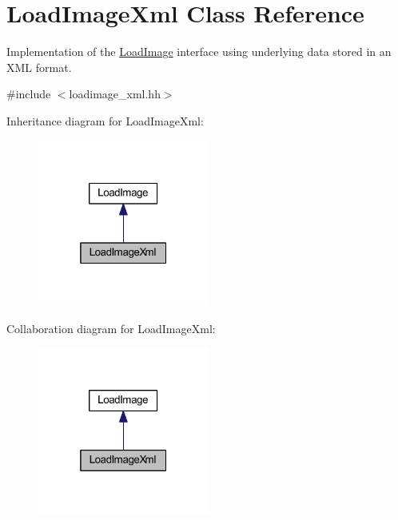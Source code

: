 \hypertarget{class_load_image_xml}{}\section{Load\+Image\+Xml Class Reference}
\label{class_load_image_xml}


Implementation of the \mbox{\hyperlink{class_load_image}{Load\+Image}} interface using underlying data stored in an X\+ML format.  




{\ttfamily \#include $<$loadimage\+\_\+xml.\+hh$>$}



Inheritance diagram for Load\+Image\+Xml\+:
\nopagebreak
\begin{figure}[H]
\begin{center}
\leavevmode
\includegraphics[width=160pt]{class_load_image_xml__inherit__graph}
\end{center}
\end{figure}


Collaboration diagram for Load\+Image\+Xml\+:
\nopagebreak
\begin{figure}[H]
\begin{center}
\leavevmode
\includegraphics[width=160pt]{class_load_image_xml__coll__graph}
\end{center}
\end{figure}
